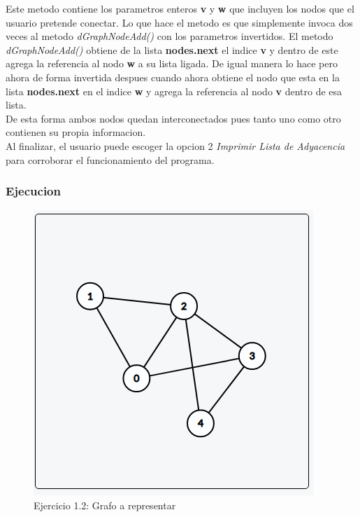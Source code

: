 \documentclass{article}
\begin{document}
				Este metodo contiene los parametros enteros \textbf{v} y \textbf{w} que incluyen los nodos que el usuario pretende conectar. Lo que hace el metodo es que simplemente invoca dos veces al metodo \emph{dGraphNodeAdd()} con los parametros invertidos. El metodo \emph{dGraphNodeAdd()} obtiene de la lista \textbf{nodes.next} el indice \textbf{v} y dentro de este agrega la referencia al nodo \textbf{w} a su lista ligada. De igual manera lo hace pero ahora de forma invertida despues cuando ahora obtiene el nodo que esta en la lista \textbf{nodes.next} en el indice \textbf{w} y agrega la referencia al nodo \textbf{v} dentro de esa lista.\\
				
				De esta forma ambos nodos quedan interconectados pues tanto uno como otro contienen su propia informacion.\\
				
				Al finalizar, el usuario puede escoger la opcion 2 \textit{Imprimir Lista de Adyacencia} para corroborar el funcionamiento del programa.
				
							
			\subsubsection{Ejecucion}
			
			\begin{figure}[H]
				\centering
				\includegraphics[scale= 0.6]{images/e12graph.png}
				\caption*{Ejercicio 1.2: Grafo a representar}
			\end{figure}
		
\end{document}
